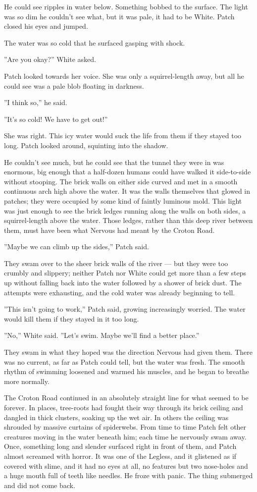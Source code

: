\documentclass[12pt]{book}
\begin{document}
He could see ripples in water below. Something bobbed to the surface. The light was so dim he couldn't see what, but it was pale, it had to be White. Patch closed his eyes and jumped.

The water was so cold that he surfaced gasping with shock.

''Are you okay?'' White asked.

Patch looked towards her voice. She was only a squirrel-length away, but all he could see was a pale blob floating in darkness.

''I think so,'' he said.

''It's so cold! We have to get out!''

She was right. This icy water would suck the life from them if they stayed too long. Patch looked around, squinting into the shadow.

He couldn't see much, but he could see that the tunnel they were in was enormous, big enough that a half-dozen humans could have walked it side-to-side without stooping. The brick walls on either side curved and met in a smooth continuous arch high above the water. It was the walls themselves that glowed in patches; they were occupied by some kind of faintly luminous mold. This light was just enough to see the brick ledges running along the walls on both sides, a squirrel-length above the water. Those ledges, rather than this deep river between them, must have been what Nervous had meant by the Croton Road.

''Maybe we can climb up the sides,'' Patch said.

They swam over to the sheer brick walls of the river ---
but they were too crumbly and slippery; neither Patch nor White could get more than a few steps up without falling back into the water followed by a shower of brick dust. The attempts were exhausting, and the cold water was already beginning to tell.

''This isn't going to work,'' Patch said, growing increasingly worried. The water would kill them if they stayed in it too long.

''No,'' White said. ''Let's swim. Maybe we'll find a better place.''

They swam in what they hoped was the direction Nervous had given them. There was no current, as far as Patch could tell, but the water was fresh. The smooth rhythm of swimming loosened and warmed his muscles, and he began to breathe more normally.

The Croton Road continued in an absolutely straight line for what seemed to be forever. In places, tree-roots had fought their way through its brick ceiling and dangled in thick clusters, soaking up the wet air. In others the ceiling was shrouded by massive curtains of spiderwebs. From time to time Patch felt other creatures moving in the water beneath him; each time he nervously swam away. Once, something long and slender surfaced right in front of them, and Patch almost screamed with horror. It was one of the Legless, and it glistened as if covered with slime, and it had no eyes at all, no features but two nose-holes and a huge mouth full of teeth like needles. He froze with panic. The thing submerged and did not come back.
\end{document}
